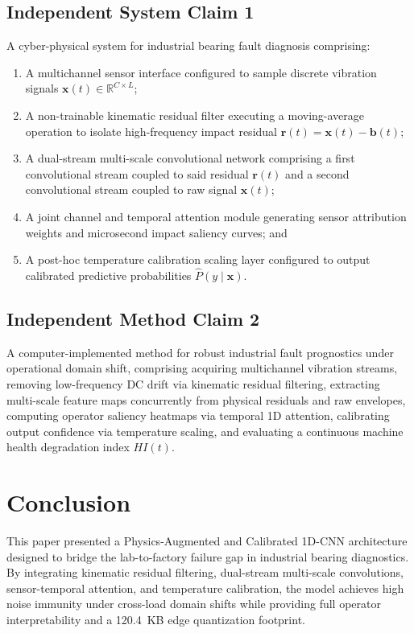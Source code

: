 ﻿\documentclass[journal,10pt,twocolumn]{IEEEtran}
\begin{document}
\subsection{Independent System Claim 1}
A cyber-physical system for industrial bearing fault diagnosis comprising:
\begin{enumerate}
    \item A multichannel sensor interface configured to sample discrete vibration signals $\mathbf{x}(t) \in \mathbb{R}^{C \times L}$;
    \item A non-trainable kinematic residual filter executing a moving-average operation to isolate high-frequency impact residual $\mathbf{r}(t) = \mathbf{x}(t) - \mathbf{b}(t)$;
    \item A dual-stream multi-scale convolutional network comprising a first convolutional stream coupled to said residual $\mathbf{r}(t)$ and a second convolutional stream coupled to raw signal $\mathbf{x}(t)$;
    \item A joint channel and temporal attention module generating sensor attribution weights and microsecond impact saliency curves; and
    \item A post-hoc temperature calibration scaling layer configured to output calibrated predictive probabilities $\hat{P}(y \mid \mathbf{x})$.
\end{enumerate}

\subsection{Independent Method Claim 2}
A computer-implemented method for robust industrial fault prognostics under operational domain shift, comprising acquiring multichannel vibration streams, removing low-frequency DC drift via kinematic residual filtering, extracting multi-scale feature maps concurrently from physical residuals and raw envelopes, computing operator saliency heatmaps via temporal 1D attention, calibrating output confidence via temperature scaling, and evaluating a continuous machine health degradation index $HI(t)$.

\section{Conclusion}
This paper presented a Physics-Augmented and Calibrated 1D-CNN architecture designed to bridge the lab-to-factory failure gap in industrial bearing diagnostics. By integrating kinematic residual filtering, dual-stream multi-scale convolutions, sensor-temporal attention, and temperature calibration, the model achieves high noise immunity under cross-load domain shifts while providing full operator interpretability and a 120.4~KB edge quantization footprint.
\end{document}
